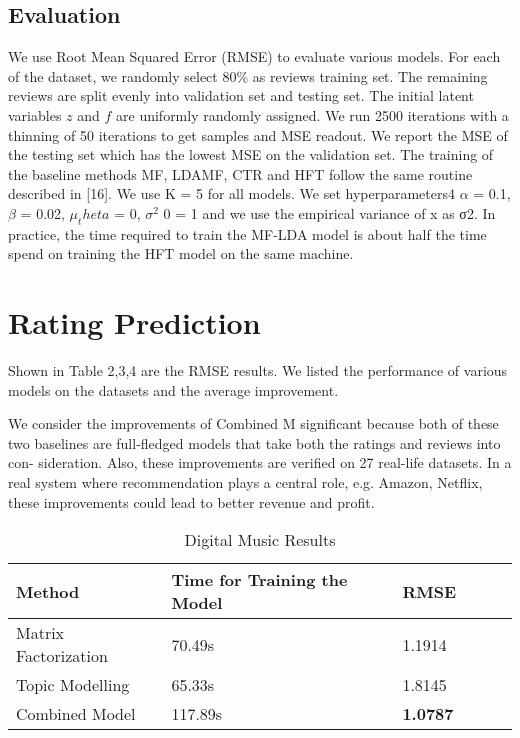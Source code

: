 \documentclass[10pt,conference]{IEEEtran}
\begin{document}
\subsection{Evaluation}
We use Root Mean Squared Error (RMSE) to evaluate various models.
For each of the dataset, we randomly select 80\% as reviews training set. The remaining reviews are split evenly into validation set and testing set. The initial latent variables $z$ and $f$ are uniformly randomly assigned. We run 2500 iterations with a thinning of 50 iterations to get samples and MSE readout. We report the MSE of the testing set which has the lowest MSE on the validation set. The training of the baseline methods MF, LDAMF, CTR and HFT follow the same routine described in [16]. We use K = 5 for all models. We set hyperparameters4 $\alpha$ = 0.1, $\beta$ = 0.02, $\mu_theta$ = 0, $\sigma^2$ 0 = 1 and we use the empirical variance of x as σ2. In practice, the time required to train the MF-LDA model is about half the time spend on training the HFT model on the same machine.

\section{Rating Prediction}

Shown in Table 2,3,4 are the RMSE results. We listed the performance of various models on the datasets and the average improvement.

We consider the improvements of Combined M significant because both of these​ two baselines are full-fledged models that take both the ratings and reviews into con- sideration. Also, these improvements are verified on 27 r​eal-life datasets. In a real system where recommendation plays a central ro​le, e.g. Amazon, Netflix, these ​improvements could le​ad to better revenue and profit.	


\begin{table}[h]
\centering
\caption{Digital Music Results}
\label{Digital Music Results}
\begin{tabular}{ llllll }
\toprule
\textbf{Method} & \textbf{Time for Training the Model} & \textbf{RMSE} \\
\midrule
Matrix Factorization & 70.49s & 1.1914 \\
\hline
Topic Modelling & 65.33s & 1.8145 \\
\hline
Combined Model & 117.89s  & \textbf{1.0787} \\ 
\bottomrule
\end{tabular}
\end{table}
\end{document}
